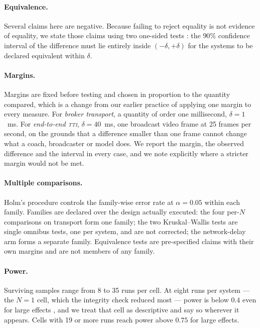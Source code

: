 \documentclass[Afour,sageh,times]{sagej}
\newcommand{\tti}{\textsc{tti}}
\begin{document}
\paragraph{Equivalence.} Several claims here are negative. Because failing to reject equality is
not evidence of equality, we state those claims using two one-sided tests
\cite{schuirmann1987tost,lakens2017equivalence}: the $90\%$ confidence interval of the difference
must lie entirely inside $(-\delta,+\delta)$ for the systems to be declared equivalent within
$\delta$.

\paragraph{Margins.} Margins are fixed before testing and chosen in proportion to the quantity
compared, which is a change from our earlier practice of applying one margin to every measure.
For \emph{broker transport}, a quantity of order one millisecond, $\delta = 1$~ms. For
\emph{end-to-end \tti{}}, $\delta = 40$~ms, one broadcast video frame at 25 frames per second, on
the grounds that a difference smaller than one frame cannot change what a coach, broadcaster or
model does. We report the margin, the observed difference and the interval in every case, and we
note explicitly where a stricter margin would not be met.

\paragraph{Multiple comparisons.} Holm's procedure \cite{holm1979simple} controls the family-wise
error rate at $\alpha = 0.05$ within each family. Families are declared over the design actually
executed: the four per-$N$ comparisons on transport form one family; the two Kruskal--Wallis
tests are single omnibus tests, one per system, and are not corrected; the network-delay arm forms
a separate family. Equivalence tests are pre-specified claims with their own margins and are not
members of any family.

\paragraph{Power.} Surviving samples range from 8 to 35 runs per cell. At eight runs per system
--- the $N{=}1$ cell, which the integrity check reduced most --- power is below $0.4$ even for
large effects \cite{cohen1988statistical}, and we treat that cell as descriptive and say so
wherever it appears. Cells with 19 or more runs reach power above $0.75$ for large effects.
\end{document}
